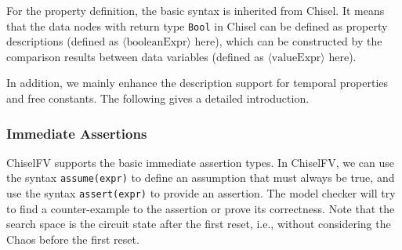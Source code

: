 \documentclass[conference]{IEEEtran}
\theoremstyle{definition}
\begin{document}
For the property definition, the basic syntax is inherited from Chisel. It means that the data nodes with return type \verb|Bool| in Chisel can be defined as property descriptions (defined as $\langle \text{booleanExpr} \rangle$ here), which can be constructed by the comparison results between data variables (defined as $\langle \text{valueExpr} \rangle$ here).

In addition, we mainly enhance the description support for temporal properties and free constants. The following gives a detailed introduction.

\subsubsection{Immediate Assertions}
ChiselFV supports the basic immediate assertion types.
In ChiselFV, we can use the syntax \verb|assume(expr)| to define an assumption that must always be true, and use the syntax \verb|assert(expr)| to provide an assertion. The model checker will try to find a counter-example to the assertion or prove its correctness. Note that the search space is the circuit state after the first reset, i.e., without considering the Chaos before the first reset.
\end{document}
